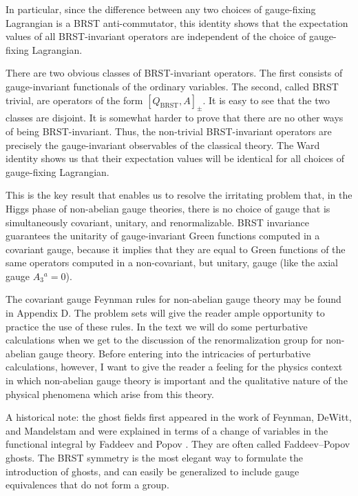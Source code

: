 In particular, since the difference between any two choices of gauge-fixing
Lagrangian is a BRST anti-commutator, this identity shows that the expectation
values of all BRST-invariant operators are independent of the choice of
gauge-fixing Lagrangian.

There are two obvious classes of BRST-invariant operators. The first consists
of gauge-invariant functionals of the ordinary variables. The second, called
BRST trivial, are operators of the form $[Q_{\mathrm{BRST}},A]_\pm$. It is easy
to see that the two classes are disjoint. It is somewhat harder to prove
\cite{banks-ref-48,banks-ref-49,banks-ref-50} that there are no other ways of being BRST-invariant. Thus, the
non-trivial BRST-invariant operators are precisely the gauge-invariant
observables of the classical theory. The Ward identity shows us that their
expectation values will be identical for all choices of gauge-fixing Lagrangian.


This is the key result that enables us to resolve the irritating problem that,
in the Higgs phase of non-abelian gauge theories, there is no choice of gauge
that is simultaneously covariant, unitary, and renormalizable. BRST invariance
guarantees the unitarity of gauge-invariant Green functions computed in a
covariant gauge, because it implies that they are equal to Green functions of
the same operators computed in a non-covariant, but unitary, gauge (like the
axial gauge $A_3{}^a=0$).

The covariant gauge Feynman rules for non-abelian gauge theory may be found in
Appendix D. The problem sets will give the reader ample opportunity to practice
the use of these rules. In the text we will do some perturbative calculations
when we get to the discussion of the renormalization group for non-abelian
gauge theory. Before entering into the intricacies of perturbative calculations,
however, I want to give the reader a feeling for the physics context in which
non-abelian gauge theory is important and the qualitative nature of the physical
phenomena which arise from this theory.

A historical note: the ghost fields first appeared in the work of Feynman,
DeWitt, and Mandelstam \cite{banks-ref-51,banks-ref-52,banks-ref-53} and were explained in terms of a change of
variables in the functional integral by Faddeev and Popov \cite{banks-ref-54}. They are often
called Faddeev--Popov ghosts. The BRST symmetry is the most elegant way to
formulate the introduction of ghosts, and can easily be generalized to include
gauge equivalences that do not form a group.
